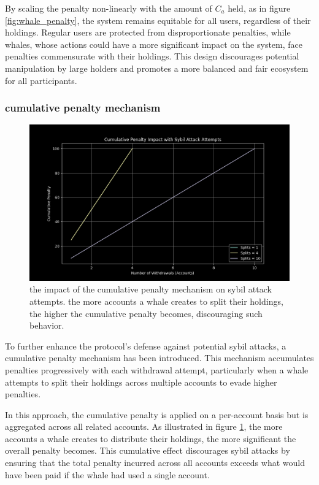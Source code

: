 \documentclass{article}
\begin{document}
By scaling the penalty non-linearly with the amount of $C_a$ held, as in figure \ref{fig:whale_penalty}, the system remains equitable for all users, regardless of their holdings. Regular users are protected from disproportionate penalties, while whales, whose actions could have a more significant impact on the system, face penalties commensurate with their holdings. This design discourages potential manipulation by large holders and promotes a more balanced and fair ecosystem for all participants.

\subsubsection{cumulative penalty mechanism}

\begin{figure}[h]
\centering
\includegraphics[width=\textwidth]{images/9.png}
\caption{the impact of the cumulative penalty mechanism on sybil attack attempts. the more accounts a whale creates to split their holdings, the higher the cumulative penalty becomes, discouraging such behavior.}
\label{fig:cumulative_penalty}
\end{figure}


To further enhance the protocol's defense against potential sybil attacks, a cumulative penalty mechanism has been introduced. This mechanism accumulates penalties progressively with each withdrawal attempt, particularly when a whale attempts to split their holdings across multiple accounts to evade higher penalties.

In this approach, the cumulative penalty is applied on a per-account basis but is aggregated across all related accounts. As illustrated in figure \ref{fig:cumulative_penalty}, the more accounts a whale creates to distribute their holdings, the more significant the overall penalty becomes. This cumulative effect discourages sybil attacks by ensuring that the total penalty incurred across all accounts exceeds what would have been paid if the whale had used a single account.
\end{document}
